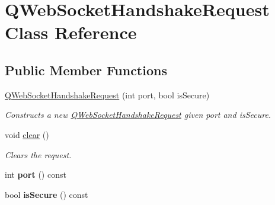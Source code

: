 \hypertarget{class_q_web_socket_handshake_request}{}\section{Q\+Web\+Socket\+Handshake\+Request Class Reference}
\label{class_q_web_socket_handshake_request}
\subsection*{Public Member Functions}
\begin{DoxyCompactItemize}
\item 
\mbox{\label{class_q_web_socket_handshake_request_acbc45c70fa01565e857b1fea27b40be2}} 
\mbox{\hyperlink{class_q_web_socket_handshake_request_acbc45c70fa01565e857b1fea27b40be2}{Q\+Web\+Socket\+Handshake\+Request}} (int port, bool is\+Secure)
\begin{DoxyCompactList}\small\item\em Constructs a new \mbox{\hyperlink{class_q_web_socket_handshake_request}{Q\+Web\+Socket\+Handshake\+Request}} given {\itshape port} and {\itshape is\+Secure}. \end{DoxyCompactList}\item 
\mbox{\label{class_q_web_socket_handshake_request_a97cfcbf814d0bcbf6a32cbe6e9c81fe9}} 
void \mbox{\hyperlink{class_q_web_socket_handshake_request_a97cfcbf814d0bcbf6a32cbe6e9c81fe9}{clear}} ()
\begin{DoxyCompactList}\small\item\em Clears the request. \end{DoxyCompactList}\item 
\mbox{\label{class_q_web_socket_handshake_request_a1ab86c4a82e2a2c8da56a37b50a15714}} 
int {\bfseries port} () const
\item 
\mbox{\label{class_q_web_socket_handshake_request_a0c78dfc698888d107d327060e0411136}} 
bool {\bfseries is\+Secure} () const
\item 
\mbox{\label{class_q_web_socket_handshake_request_a8e48f0467ab74bd876b8721d3f763d6f}} 

\end{DoxyCompactItemize}
